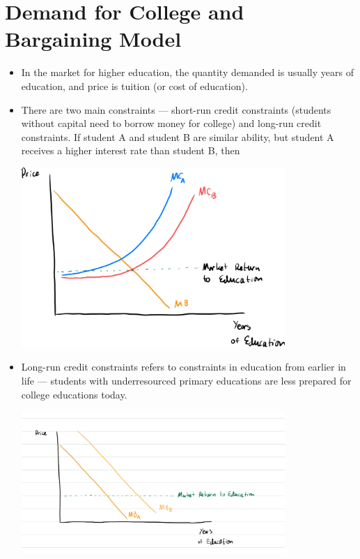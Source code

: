 \documentclass[10pt]{extarticle}
\begin{document}
  \section{Demand for College and Bargaining Model}%
  \begin{itemize}
    \item In the market for higher education, the quantity demanded is usually years of education, and price is tuition (or cost of education).
    \item There are two main constraints --- short-run credit constraints (students without capital need to borrow money for college) and long-run credit constraints. If student A and student B are similar ability, but student A receives a higher interest rate than student B, then 
      \begin{center}
        \includegraphics[width=10cm]{images/short_run_credit_constraints.png}
      \end{center}
    \item Long-run credit constraints refers to constraints in education from earlier in life --- students with underresourced primary educations are less prepared for college educations today.
      \begin{center}
        \includegraphics[width=10cm]{images/long_run_credit_constraints.jpeg}
      \end{center}

\end{itemize}
\end{document}
